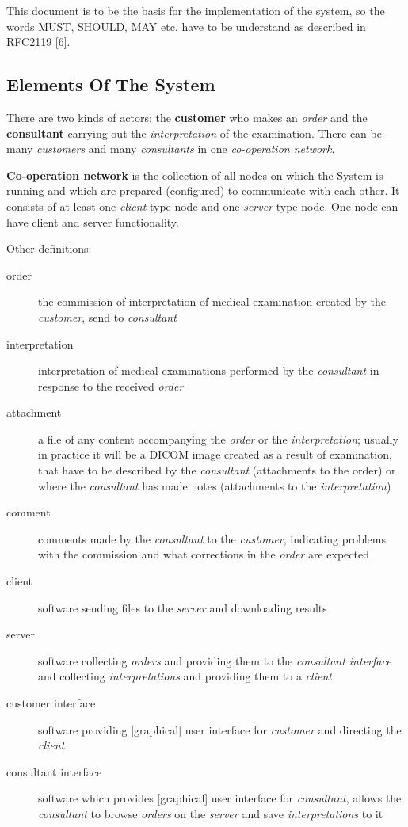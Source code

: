 \documentclass[a4paper]{article}
\begin{document}
This document is to be the basis for the implementation of the system, so the words MUST,
SHOULD, MAY etc. have to be understand as described in RFC2119 [6].

\subsection{Elements Of The System}

There are two kinds of actors: the \textbf{customer} who makes an \emph{order}
and the \textbf{consultant} carrying out the \emph{interpretation} of the examination.
There can be many \emph{customers} and many \emph{consultants} in one \emph{co-operation
network}.

\textbf{Co-operation network} is the collection of all nodes on which the System is
running and which are prepared (configured) to communicate with each other. It consists
of at least one \emph{client} type node and one \emph{server} type node. One node can
have client and server functionality.

Other definitions:
\begin{description}
  \item[order] the commission of interpretation of medical examination created by the
  \emph{customer}, send to \emph{consultant}
  \item[interpretation] interpretation of medical examinations performed by the
  \emph{consultant} in response to the received \emph{order}
  \item[attachment] a file of any content accompanying the \emph{order} or
  the \emph{interpretation}; usually in practice it will be a DICOM image created as a result
  of examination, that have to be described by the \emph{consultant} (attachments to the
  order) or where the \emph{consultant} has made notes (attachments to the
  \emph{interpretation})
  \item[comment] comments made by the \emph{consultant} to the \emph{customer}, indicating
  problems with the commission and what corrections in the \emph{order} are expected
  \item[client] software sending files to the \emph{server} and downloading
  results
  \item[server] software collecting \emph{orders} and providing them to the
  \emph{consultant interface} and collecting \emph{interpretations} and providing them
  to a \emph{client}
  \item[customer interface] software providing [graphical] user interface for 
  \emph{customer} and directing the \emph{client}
  \item[consultant interface] software which provides [graphical] user interface for
  \emph{consultant}, allows the \emph{consultant} to browse \emph{orders} on the
  \emph{server} and save \emph{interpretations} to it
\end{description}
\end{document}
